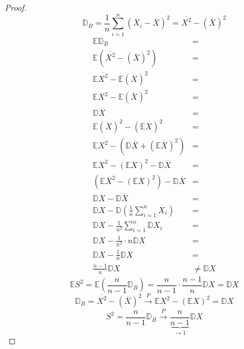 \begin{proof}
    \[\mathbb{D}_B = \frac{1}{n} \sum_{i=1}^{n} (X_i - \overline{X})^2 = \overline{X^2} - (\overline{X})^2\]
    \begin{align*}
        \mathbb{E} \mathbb{D}_B                                                  & =                 \\ \mathbb{E} (\overline{X^2} - (\overline{X})^2) & = \\ \mathbb{E} \overline{X^2} - \mathbb{E} (\overline{X})^2 & = \\ \mathbb{E} X^2 - \mathbb{E} (\overline{X})^2 & = \\ \mathbb{D} \overline{X} & = \\ \mathbb{E} (\overline{X})^2 - (\mathbb{E} \overline{X})^2 & = \\
        \mathbb{E} X^2 - (\mathbb{D} \overline{X} + (\mathbb{E} \overline{X})^2) & =                 \\
        \mathbb{E} X^2 - (\mathbb{E} X)^2 - \mathbb{D} \overline{X}              & =                 \\
        (\mathbb{E} X^2 - (\mathbb{E} X)^2) - \mathbb{D} \overline{X}            & =                 \\
        \mathbb{D} X - \mathbb{D} \overline{X}                                   & =                 \\
        \mathbb{D} X - \mathbb{D} \left( \frac{1}{n} \sum_{i=1}^{n} X_i \right)  & =                 \\
        \mathbb{D} X - \frac{1}{n^2} \sum_{i=1}^{n} \mathbb{D} X_i               & =                 \\
        \mathbb{D} X - \frac{1}{n^2} \cdot n \mathbb{D} X                        & =                 \\
        \mathbb{D} X - \frac{1}{n} \mathbb{D} X                                  & =                 \\
        \frac{n - 1}{n} \mathbb{D} X                                             & \neq \mathbb{D} X
    \end{align*}
    \[\mathbb{E} S^2 = \mathbb{E} \left( \frac{n}{n -1} \mathbb{D}_B \right) = \frac{n}{n - 1} \cdot \frac{n - 1}{n} \mathbb{D} X = \mathbb{D} X\]
    \[\mathbb{D}_B = \overline{X^2} - (\overline{X})^2 \xrightarrow[]{P} \mathbb{E} X^2 - (\mathbb{E} X)^2 = \mathbb{D} X\]
    \[S^2 = \frac{n}{n - 1} \mathbb{D}_B \xrightarrow[]{P} \underbrace{\frac{n}{n - 1}}_{ \to 1} \mathbb{D} X\]
\end{proof}


